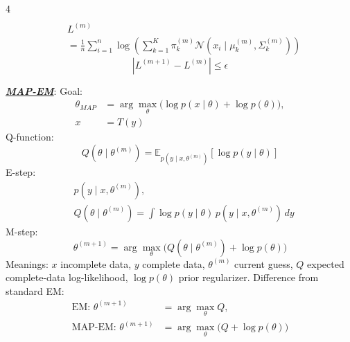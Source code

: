\documentclass[12pt]{article}
\newcommand{\bulletPoint}[1]{\ul{\textit{\textbf{#1}}}}
\begin{document}
\begin{multicols*}{4}
\begin{equation*}
\begin{split}
    \end{split}
\end{equation*}
\useshortskip \begin{equation*}
    \begin{split}
        &L^{(m)} \\
        &=\frac{1}{n}\sum_{i=1}^{n}\log\!\left(
        \sum_{k=1}^{K}\pi_k^{(m)}
        \mathcal{N}(x_i\mid\mu_k^{(m)},\Sigma_k^{(m)})\right)
    \end{split}
\end{equation*}
\useshortskip \begin{equation*}
    |L^{(m+1)}-L^{(m)}|\le\epsilon
\end{equation*}

\bulletPoint{MAP-EM}:
Goal:
\useshortskip \begin{equation*}
    \begin{split}
        \theta_{MAP}&=\arg\max_{\theta}
        \big(\log p(x\mid\theta)+\log p(\theta)\big),\\
        x&=T(y)
    \end{split}
\end{equation*}
Q-function:
\useshortskip \begin{equation*}
    Q(\theta\mid\theta^{(m)})=
    \mathbb{E}_{p(y\mid x,\theta^{(m)})}
    \!\left[\log p(y\mid\theta)\right]
\end{equation*}
E-step:
\useshortskip \begin{equation*}
    \begin{split}
        &p(y\mid x,\theta^{(m)}),\\
        &Q(\theta\mid\theta^{(m)})
        =\int \log p(y\mid\theta)\,p(y\mid x,\theta^{(m)})\,dy
    \end{split}
\end{equation*}
M-step:
\useshortskip \begin{equation*}
    \theta^{(m+1)}=
    \arg\max_{\theta}\Big(Q(\theta\mid\theta^{(m)})+\log p(\theta)\Big)
\end{equation*}
Meanings: $x$ incomplete data, $y$ complete data, $\theta^{(m)}$ current guess, $Q$ expected complete-data log-likelihood, $\log p(\theta)$ prior regularizer.
Difference from standard EM:
\useshortskip \begin{equation*}
    \begin{split}
        \text{EM: }\theta^{(m+1)}&=\arg\max_{\theta}Q,\\
        \text{MAP-EM: }\theta^{(m+1)}
        &=\arg\max_{\theta}\big(Q+\log p(\theta)\big)
    \end{split}

\end{equation*}
\end{multicols*}
\end{document}
